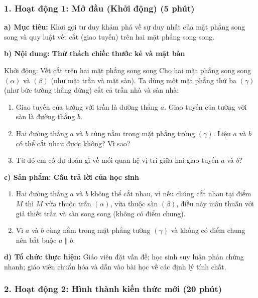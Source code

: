 \documentclass[12pt, a4paper]{article}
\begin{document}
\subsubsection*{1. Hoạt động 1: Mở đầu (Khởi động) (5 phút)}

\noindent \textbf{a) Mục tiêu:}
Khơi gợi tư duy khám phá về sự duy nhất của mặt phẳng song song và quy luật vết cắt (giao tuyến) trên hai mặt phẳng song song.

\noindent \textbf{b) Nội dung: Thử thách chiếc thước kẻ và mặt bàn}
\begin{pedabox}{Khởi động: Vết cắt trên hai mặt phẳng song song}
Cho hai mặt phẳng song song $(\alpha)$ và $(\beta)$ (như mặt trần và mặt sàn). Ta dùng một mặt phẳng thứ ba $(\gamma)$ (như bức tường thẳng đứng) cắt cả trần nhà và sàn nhà:
\begin{enumerate}[leftmargin=0.6cm]
    \item Giao tuyến của tường với trần là đường thẳng $a$. Giao tuyến của tường với sàn là đường thẳng $b$.
    \item Hai đường thẳng $a$ và $b$ cùng nằm trong mặt phẳng tường $(\gamma)$. Liệu $a$ và $b$ có thể cắt nhau được không? Vì sao?
    \item Từ đó em có dự đoán gì về mối quan hệ vị trí giữa hai giao tuyến $a$ và $b$?
\end{enumerate}
\end{pedabox}

\noindent \textbf{c) Sản phẩm: Câu trả lời của học sinh}
\begin{enumerate}[leftmargin=0.6cm]
    \item Hai đường thẳng $a$ và $b$ không thể cắt nhau, vì nếu chúng cắt nhau tại điểm $M$ thì $M$ vừa thuộc trần $(\alpha)$, vừa thuộc sàn $(\beta)$, điều này mâu thuẫn với giả thiết trần và sàn song song (không có điểm chung).
    \item Vì $a$ và $b$ cùng nằm trong mặt phẳng tường $(\gamma)$ và không có điểm chung nên bắt buộc $a \parallel b$.
\end{enumerate}

\noindent \textbf{d) Tổ chức thực hiện:}
Giáo viên đặt vấn đề; học sinh suy luận phản chứng nhanh; giáo viên chuẩn hóa và dẫn vào bài học về các định lý tính chất.

\subsubsection*{2. Hoạt động 2: Hình thành kiến thức mới (20 phút)}
\end{document}
